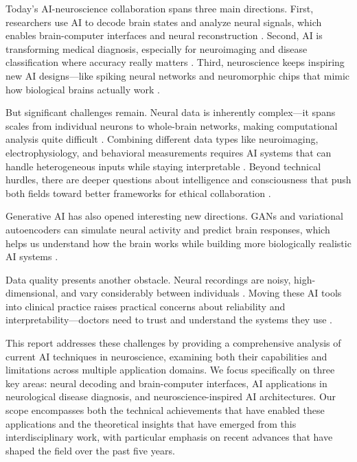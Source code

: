 \documentclass[conference]{IEEEtran}
\begin{document}
Today's AI-neuroscience collaboration spans three main directions. First, researchers use AI to decode brain states and analyze neural signals, which enables brain-computer interfaces and neural reconstruction \citep{lawhernEEGNetCompactConvolutional2018, mathisDecodingBrainNeural2024}. Second, AI is transforming medical diagnosis, especially for neuroimaging and disease classification where accuracy really matters \citep{hechkelEarlyDetectionClassification2025, shamratAlzheimerNetEffectiveDeep2023}. Third, neuroscience keeps inspiring new AI designs—like spiking neural networks and neuromorphic chips that mimic how biological brains actually work \citep{daviesLoihiNeuromorphicManycore2018}.

But significant challenges remain. Neural data is inherently complex—it spans scales from individual neurons to whole-brain networks, making computational analysis quite difficult \citep{onciulArtificialIntelligenceNeuroscience2025}. Combining different data types like neuroimaging, electrophysiology, and behavioral measurements requires AI systems that can handle heterogeneous inputs while staying interpretable \citep{lorenziIntegrationMultimodalData2023}. Beyond technical hurdles, there are deeper questions about intelligence and consciousness that push both fields toward better frameworks for ethical collaboration \citep{hassabisNeuroscienceinspiredArtificialIntelligence2017}.

Generative AI has also opened interesting new directions. GANs and variational autoencoders can simulate neural activity and predict brain responses, which helps us understand how the brain works while building more biologically realistic AI systems \citep{gucluDeepNeuralNetworks2015, onciulArtificialIntelligenceNeuroscience2025}.

Data quality presents another obstacle. Neural recordings are noisy, high-dimensional, and vary considerably between individuals \citep{richardsDeepLearningFramework2019}. Moving these AI tools into clinical practice raises practical concerns about reliability and interpretability—doctors need to trust and understand the systems they use \citep{hassabisNeuroscienceinspiredArtificialIntelligence2017}.

This report addresses these challenges by providing a comprehensive analysis of current AI techniques in neuroscience, examining both their capabilities and limitations across multiple application domains. We focus specifically on three key areas: neural decoding and brain-computer interfaces, AI applications in neurological disease diagnosis, and neuroscience-inspired AI architectures. Our scope encompasses both the technical achievements that have enabled these applications and the theoretical insights that have emerged from this interdisciplinary work, with particular emphasis on recent advances that have shaped the field over the past five years.
\end{document}
